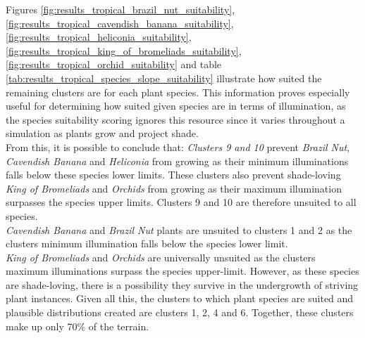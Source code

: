 Figures \ref{fig:results_tropical_brazil_nut_suitability}, \ref{fig:results_tropical_cavendish_banana_suitability}, \ref{fig:results_tropical_heliconia_suitability}, \ref{fig:results_tropical_king_of_bromeliads_suitability}, \ref{fig:results_tropical_orchid_suitability} and table \ref{tab:results_tropical_species_slope_suitability} illustrate how suited the remaining clusters are for each plant species. This information proves especially useful for determining how suited given species are in terms of illumination, as the species suitability scoring ignores this resource since it varies throughout a simulation as plants grow and project shade.\\
From this, it is possible to conclude that: \textit{Clusters 9 and 10} prevent \textit{Brazil Nut}, \textit{Cavendish Banana} and \textit{Heliconia} from growing as their minimum illuminations falls below these species lower limits. These clusters also prevent shade-loving \textit{King of Bromeliads} and \textit{Orchids} from growing as their maximum illumination surpasses the species upper limits. Clusters 9 and 10 are therefore unsuited to all species.\\
\textit{Cavendish Banana} and \textit{Brazil Nut} plants are unsuited to clusters 1 and 2 as the clusters minimum illumination falls below the species lower limit.\\
\textit{King of Bromeliads} and \textit{Orchids} are universally unsuited as the clusters maximum illuminations surpass the species upper-limit. However, as these species are shade-loving, there is a possibility they survive in the undergrowth of striving plant instances. Given all this, the clusters to which plant species are suited and plausible distributions created are clusters 1, 2, 4 and 6. Together, these clusters make up only 70\% of the terrain.\\

